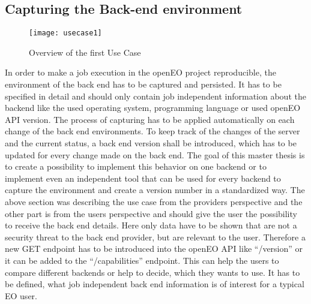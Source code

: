 \documentclass[draft,final]{vutinfth} %
\begin{document}
\subsection{Capturing the Back-end environment}\label{UseCase1}
\begin{figure}[h]
	\centering
	\texttt{[image: usecase1]}
	\caption{Overview of the first Use Case}
	\label{fig:usecase1} %
\end{figure}
In order to make a job execution in the openEO project reproducible, the environment of the back end has to be captured and persisted. It has to be specified in detail and should only contain job independent information about the backend like the used operating system, programming language or used openEO API version. The process of capturing has to be applied automatically on each change of the back end environments. To keep track of the changes of the server and the current status, a back end version shall be introduced, which has to be updated for every change made on the back end. The goal of this master thesis is to create a possibility to implement this behavior on one backend or to implement even an independent tool that can be used for every backend to capture the environment and create a version number in a standardized way.
The above section was describing the use case from the providers perspective and the other part is from the users perspective and should give the user the possibility to receive the back end details. Here only data have to be shown that are not a security threat to the back end provider, but are relevant to the user. Therefore a new GET endpoint has to be introduced into the openEO API like “/version” or it can be added to the “/capabilities” endpoint. This can help the users to compare different backends or help to decide, which they wants to use. It has to be defined, what job independent back end information is of interest for a typical EO user.   
\end{document}
